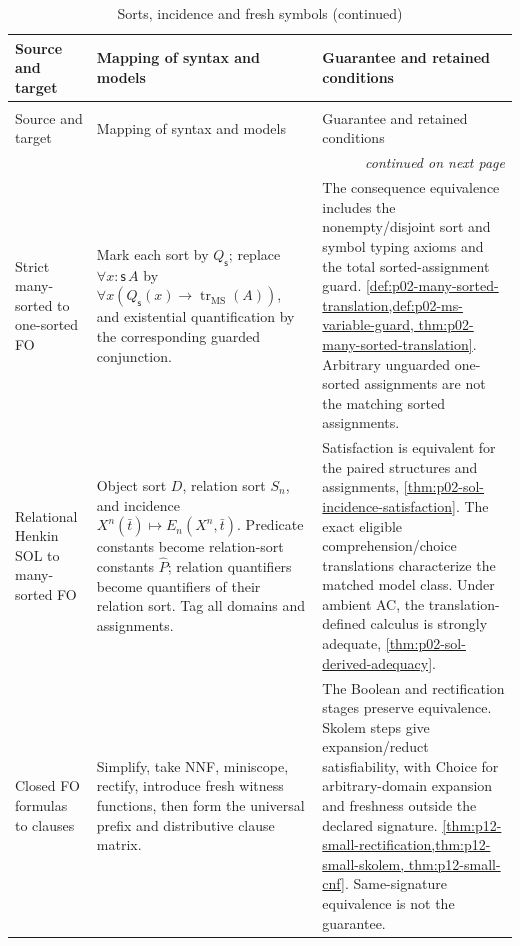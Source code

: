 \begin{longtable}{@{}p{}p{}p{}@{}}
\caption{Sorts, incidence and fresh symbols}\\
\toprule
Source and target & Mapping of syntax and models & Guarantee and retained conditions \\
\midrule
\endfirsthead
\caption[]{Sorts, incidence and fresh symbols (continued)}\\
\toprule
Source and target & Mapping of syntax and models & Guarantee and retained conditions \\
\midrule
\endhead
\midrule\multicolumn{3}{r}{\emph{continued on next page}}\\
\endfoot
\endlastfoot
Strict many-sorted to one-sorted FO &
Mark each sort by \(Q_{\mathsf s}\); replace
\(\forall x{:}\mathsf s\,A\) by
\(\forall x(Q_{\mathsf s}(x)\to\operatorname{tr}_{\mathrm{MS}}(A))\),
and existential quantification by the corresponding guarded conjunction. &
The consequence equivalence includes the nonempty/disjoint sort and symbol
typing axioms and the total sorted-assignment guard.
\cref{def:p02-many-sorted-translation,def:p02-ms-variable-guard,
thm:p02-many-sorted-translation}. Arbitrary unguarded one-sorted assignments
are not the matching sorted assignments. \\
Relational Henkin SOL to many-sorted FO &
Object sort \(D\), relation sort \(S_n\), and incidence
\(X^n(\bar t)\mapsto E_n(X^n,\bar t)\). Predicate constants become
relation-sort constants \(\widehat P\); relation quantifiers become
quantifiers of their relation sort. Tag all domains and assignments. &
Satisfaction is equivalent for the paired structures and assignments,
\cref{thm:p02-sol-incidence-satisfaction}. The exact eligible
comprehension/choice translations characterize the matched model class.
Under ambient AC, the translation-defined calculus is strongly adequate,
\cref{thm:p02-sol-derived-adequacy}. \\
Closed FO formulas to clauses &
Simplify, take NNF, miniscope, rectify, introduce fresh witness functions,
then form the universal prefix and distributive clause matrix. &
The Boolean and rectification stages preserve equivalence. Skolem steps
give expansion/reduct satisfiability, with Choice for arbitrary-domain
expansion and freshness outside the declared signature.
\cref{thm:p12-small-rectification,thm:p12-small-skolem,
thm:p12-small-cnf}. Same-signature equivalence is not the guarantee. \\
\bottomrule
\end{longtable}

